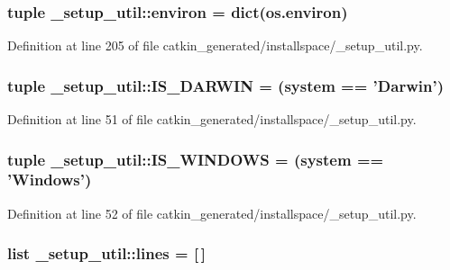 \subsubsection[{environ}]{\setlength{\rightskip}{0pt plus 5cm}tuple {\bf \-\_\-setup\-\_\-util\-::environ} = dict(os.\-environ)}\label{namespace__setup__util_a0a3189a3fa13a696964c791ed2a5ea85}


\-Definition at line 205 of file catkin\-\_\-generated/installspace/\-\_\-setup\-\_\-util.\-py.

\subsubsection[{\-I\-S\-\_\-\-D\-A\-R\-W\-I\-N}]{\setlength{\rightskip}{0pt plus 5cm}tuple {\bf \-\_\-setup\-\_\-util\-::\-I\-S\-\_\-\-D\-A\-R\-W\-I\-N} = ({\bf system} == '\-Darwin')}\label{namespace__setup__util_aecbb100ce6f94bb3c7e16d58fde05f96}


\-Definition at line 51 of file catkin\-\_\-generated/installspace/\-\_\-setup\-\_\-util.\-py.

\subsubsection[{\-I\-S\-\_\-\-W\-I\-N\-D\-O\-W\-S}]{\setlength{\rightskip}{0pt plus 5cm}tuple {\bf \-\_\-setup\-\_\-util\-::\-I\-S\-\_\-\-W\-I\-N\-D\-O\-W\-S} = ({\bf system} == '\-Windows')}\label{namespace__setup__util_a6fe69c2dbd92959b6651a28cbb846e6e}


\-Definition at line 52 of file catkin\-\_\-generated/installspace/\-\_\-setup\-\_\-util.\-py.

\subsubsection[{lines}]{\setlength{\rightskip}{0pt plus 5cm}list {\bf \-\_\-setup\-\_\-util\-::lines} = [$\,$]}\label{namespace__setup__util_a8618d8be5f729d4c9696daa5e083a001}


